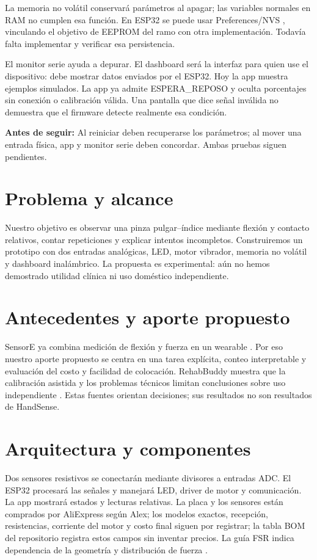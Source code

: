 \documentclass[11pt,a4paper]{article}
\newcommand{\comprobar}[1]{\par\smallskip\noindent\colorbox{suave}{\parbox{\dimexpr\linewidth-2\fboxsep}{\textbf{Antes de seguir:} #1}}\par\smallskip}
\begin{document}
La memoria no volátil conservará parámetros al apagar; las variables normales en RAM no cumplen esa función. En ESP32 se puede usar Preferences/NVS \cite{nvs}, vinculando el objetivo de EEPROM del ramo con otra implementación. Todavía falta implementar y verificar esa persistencia.

El monitor serie ayuda a depurar. El dashboard será la interfaz para quien use el dispositivo: debe mostrar datos enviados por el ESP32. Hoy la app muestra ejemplos simulados. La app ya admite ESPERA\_REPOSO y oculta porcentajes sin conexión o calibración válida. Una pantalla que dice señal inválida no demuestra que el firmware detecte realmente esa condición.
\comprobar{Al reiniciar deben recuperarse los parámetros; al mover una entrada física, app y monitor serie deben concordar. Ambas pruebas siguen pendientes.}

\section{Problema y alcance}
Nuestro objetivo es observar una pinza pulgar--índice mediante flexión y contacto relativos, contar repeticiones y explicar intentos incompletos. Construiremos un prototipo con dos entradas analógicas, LED, motor vibrador, memoria no volátil y dashboard inalámbrico. La propuesta es experimental: aún no hemos demostrado utilidad clínica ni uso doméstico independiente.
\section{Antecedentes y aporte propuesto}
SensorE ya combina medición de flexión y fuerza en un wearable \cite{sensore}. Por eso nuestro aporte propuesto se centra en una tarea explícita, conteo interpretable y evaluación del costo y facilidad de colocación. RehabBuddy muestra que la calibración asistida y los problemas técnicos limitan conclusiones sobre uso independiente \cite{rehab}. Estas fuentes orientan decisiones; sus resultados no son resultados de HandSense.
\section{Arquitectura y componentes}
Dos sensores resistivos se conectarán mediante divisores a entradas ADC. El ESP32 procesará las señales y manejará LED, driver de motor y comunicación. La app mostrará estados y lecturas relativas. La placa y los sensores están comprados por AliExpress según Alex; los modelos exactos, recepción, resistencias, corriente del motor y costo final siguen por registrar; la tabla BOM del repositorio registra estos campos sin inventar precios. La guía FSR indica dependencia de la geometría y distribución de fuerza \cite{fsr}.
\end{document}
